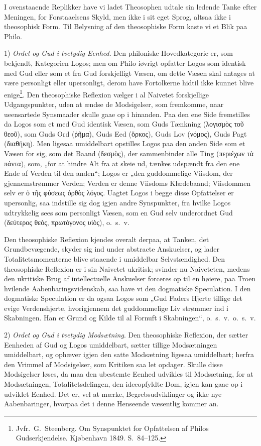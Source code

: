\documentclass[12pt]{book}
\newcommand{\opage}[1]{\marginnote{\footnotesize\textit{[#1]}}}
\begin{document}
I ovenstaaende Replikker have vi ladet Theosophen udtale
sin ledende Tanke efter Meningen, for Forstaaelsens Skyld,
men ikke i sit eget Sprog, altsaa ikke i theosophisk Form.
Til Belysning af den theosophiske Form kaste vi et Blik paa
Philo.

1) \emph{Ordet og Gud i tvetydig Eenhed}. Den philoniske
Hovedkategorie er, som bekjendt, Kategorien Logos; men
om Philo iøvrigt opfatter Logos som identisk med Gud eller
som et fra Gud forskjelligt Væsen, om dette Væsen skal antages
at være personligt eller upersonligt, derom have Fortolkerne
hidtil ikke kunnet blive enige\footnote{Jvfr.\ G.\ Steenberg. Om Synspunktet for Opfattelsen af Philos
Gudserkjendelse. Kjøbenhavn 1849. S.\ 84--125.}. %
Den theosophiske
Reflexion vælger i al Naivetet forskjellige Udgangspunkter,
uden at ændse de Modsigelser, som fremkomme, naar
ueensartede Synsmaader skulle gaae op i hinanden. Paa
den ene Side fremstilles da Logos som et med Gud identisk
Væsen, som Guds Tænkning (λογισμὸς τοῦ θεοῦ), som Guds
Ord (ῥῆμα), Guds Eed (ὅρκος), Guds Lov (νόμος), Guds
Pagt (διαθήκη). Men ligesaa umiddelbart opstilles Logos
paa den anden Side som et Væsen for sig, som det Baand
(δεσμὸς), der sammenbinder alle Ting (περιέχων τὰ πάντα),
som, „for at hindre Alt fra at skeie ud, tænkes udspændt fra
den ene Ende af Verden til den anden“; Logos er „den guddommelige
Viisdom, der gjennemstrømmer Verden; Verden %
er denne Viisdoms Klædebaand; Viisdommen selv er ὁ τῆς
φύσεως ὀρθὸς λόγος. Uagtet Logos i begge disse Opfattelser
er upersonlig, saa indstille sig dog igjen andre Synspunkter,
fra hvilke Logos udtrykkelig sees som personligt Væsen,
som en Gud selv underordnet Gud (δεύτερος θεὸς, πρωτόγονος
υἱὸς), o.\ s.\ v.

\opage{90}Den theosophiske Reflexion kjendes overalt derpaa, at
Tanken, det Grundbevægende, skyder sig ind under abstracte
Anskuelser, og lader Totalitetsmomenterne blive staaende i
umiddelbar Selvstændighed. Den theosophiske Reflexion er
i sin Naivetet ukritisk; svinder nu Naiveteten, medens den
ukritiske Brug af intellectuelle Anskuelser forceres op til en
høiere, paa Troen hvilende Aabenbaringsvidenskab, saa have
vi den dogmatiske Speculation. I den dogmatiske Speculation
er da ogsaa Logos som „Gud Faders Hjerte tillige det evige
Verdenshjerte, hvorigjennem det guddommelige Liv strømmer
ind i Skabningen. Han er Grund og Kilde til al Fornuft
i Skabningen“, o.\ s.\ v.\ o.\ s.\ v.

2) \emph{Ordet og Gud i tvetydig Modsætning}. Den
theosophiske Reflexion, der sætter Eenheden af Gud og Logos
umiddelbart, sætter tillige Modsætningen umiddelbart, og ophæver
igjen den satte Modsætning ligesaa umiddelbart; herfra
den Vrimmel af Modsigelser, som Kritiken saa let opdager.
Skulle disse Modsigelser løses, da maa den ubestemte Eenhed
udvikles til Modsætning, for at Modsætningen, Totalitetsdelingen,
den ideeopfyldte Dom, igjen kan gaae op i udviklet Eenhed.
Det er, vel at mærke, Begrebsudviklinger og ikke nye Aabenbaringer,
hvorpaa det i denne Henseende væsentlig kommer an.
\end{document}
